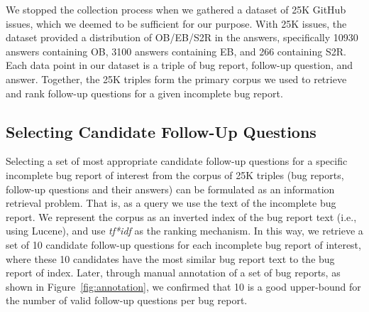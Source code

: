 We stopped the collection process when we gathered a dataset of 25K GitHub issues, which we deemed to be sufficient for our purpose. With 25K issues, the dataset provided a distribution of OB/EB/S2R in the answers, specifically 10930 answers containing OB, 3100 answers containing EB, and 266 containing S2R. Each data point in our dataset is a triple of
bug report, follow-up question, and answer.  Together, the 25K triples form the primary corpus we used to
retrieve and rank follow-up questions for a given incomplete bug report.


\subsection{Selecting Candidate Follow-Up Questions}

Selecting a set of most appropriate candidate follow-up questions for a specific incomplete bug report of interest from the corpus
of 25K triples (bug reports, follow-up questions and their answers) can be formulated as an information retrieval
problem. That is, as a query we use the text of the incomplete bug report. We represent the corpus
as an inverted index of the bug report text (i.e., using Lucene), and use {\em tf*idf} as the
ranking mechanism. In this way, we retrieve a set of 10 candidate follow-up questions for each incomplete bug report
of interest, where these 10 candidates have the most similar bug report text to the bug report of index. Later, through manual annotation of a set of bug reports, as shown in Figure~\ref{fig:annotation}, we confirmed that 10 is a good upper-bound for the number of valid follow-up questions per bug report.

